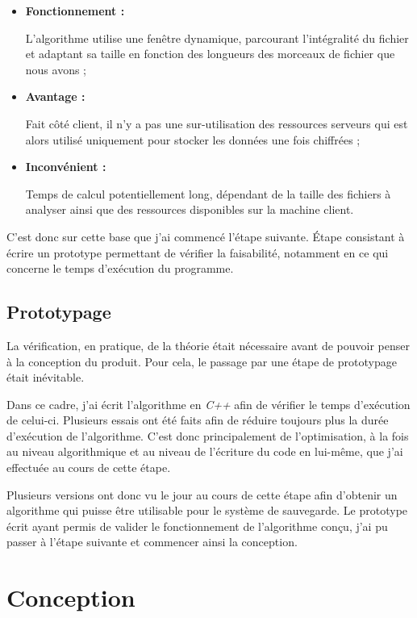 \documentclass[a4paper,10pt, twoside]{report}
\begin{document}
\begin{spacing}{1.2}
\begin{itemize}
 \item \textbf{Fonctionnement :}
 
 L'algorithme utilise une fenêtre dynamique, parcourant l'intégralité du
 fichier et adaptant sa taille en fonction des longueurs des morceaux de
 fichier que nous avons ;
 
 \item \textbf{Avantage :}
 
 Fait côté client, il n'y a pas une sur-utilisation des ressources serveurs
 qui est alors utilisé uniquement pour stocker les données une fois
 chiffrées ;
 
 \item \textbf{Inconvénient :}
 
 Temps de calcul potentiellement long, dépendant de la taille des fichiers à
 analyser ainsi que des ressources disponibles sur la machine client.
\end{itemize}

C'est donc sur cette base que j'ai commencé l'étape suivante. Étape consistant
à écrire un prototype permettant de vérifier la faisabilité, notamment en ce
qui concerne le temps d'exécution du programme.

\subsection{Prototypage}

La vérification, en pratique, de la théorie était nécessaire avant de pouvoir
penser à la conception du produit. Pour cela, le passage par une étape de
prototypage était inévitable.

Dans ce cadre, j'ai écrit l'algorithme en \textit{C++} afin de vérifier le
temps d'exécution de celui-ci. Plusieurs essais ont été faits afin de réduire
toujours plus la durée d'exécution de l'algorithme. C'est donc principalement
de l'optimisation, à la fois au niveau algorithmique et au niveau de l'écriture
du code en lui-même, que j'ai effectuée au cours de cette étape.

Plusieurs versions ont donc vu le jour au cours de cette étape afin d'obtenir
un algorithme qui puisse être utilisable pour le système de sauvegarde. Le
prototype écrit ayant permis de valider le fonctionnement de l'algorithme
conçu, j'ai pu passer à l'étape suivante et commencer ainsi la conception.

\section{Conception}

\end{spacing}
\end{document}
